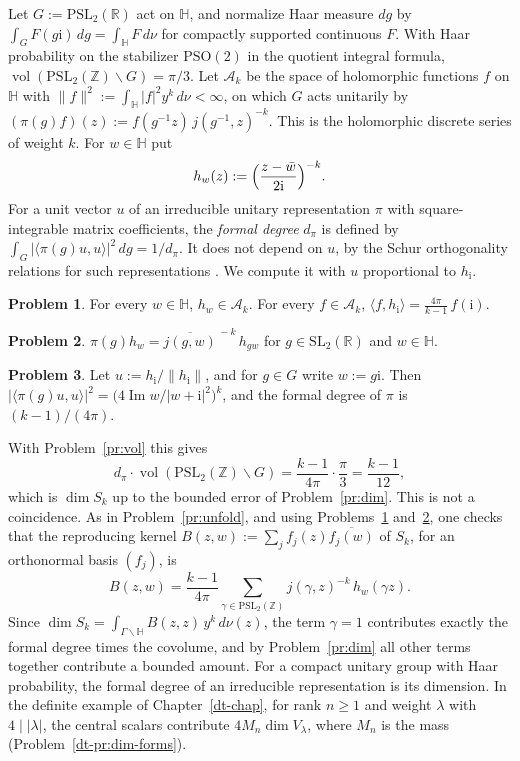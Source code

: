 \documentclass[reqno]{amsart}
\newcounter{chap}
\theoremstyle{definition}
\newtheorem{problem}{Problem}[section]
\theoremstyle{plain}
\newcommand{\Z}{\mathbb{Z}}
\newcommand{\R}{\mathbb{R}}
\newcommand{\HH}{\mathbb{H}}
\newcommand{\ii}{\mathrm{i}}
\newcommand{\Ac}{\mathcal{A}}
\newcommand{\vol}{\operatorname{vol}}
\begin{document}
Let \(G:=\mathrm{PSL}_2(\R)\) act on \(\HH\), and normalize Haar measure \(dg\) by \(\int_G F(g\ii)\,dg=\int_\HH F\,d\nu\) for compactly supported continuous \(F\).  With Haar probability on the stabilizer \(\mathrm{PSO}(2)\) in the quotient integral formula, \(\vol(\mathrm{PSL}_2(\Z)\backslash G)=\pi/3\).  Let \(\Ac_k\) be the space of holomorphic functions \(f\) on \(\HH\) with \(\lVert f\rVert^2 := \int_\HH \lvert f\rvert^2 y^k\,d\nu < \infty\), on which \(G\) acts unitarily by \((\pi(g)f)(z) := f(g^{-1}z)\,j(g^{-1},z)^{-k}\).  This is the holomorphic discrete series of weight \(k\).  For \(w \in \HH\) put
\[
  h_w(z) := \Bigl(\frac{z - \bar w}{2\ii}\Bigr)^{-k} .
\]
For a unit vector \(u\) of an irreducible unitary representation \(\pi\) with square-integrable matrix coefficients, the \emph{formal degree} \(d_\pi\) is defined by \(\int_G \lvert\langle\pi(g)u, u\rangle\rvert^2\,dg = 1/d_\pi\).  It does not depend on \(u\), by the Schur orthogonality relations for such representations \cite{HC}.  We compute it with \(u\) proportional to \(h_\ii\).

\begin{problem}\label{pr:cayley}
For every \(w \in \HH\), \(h_w \in \Ac_k\).  For every \(f \in \Ac_k\), \(\langle f, h_\ii\rangle = \frac{4\pi}{k-1}\, f(\ii)\).
\end{problem}

\begin{problem}\label{pr:covariance}
\(\pi(g)h_w = \overline{j(g,w)}^{\,-k}\, h_{gw}\) for \(g \in \mathrm{SL}_2(\R)\) and \(w \in \HH\).
\end{problem}

\begin{problem}\label{pr:formal-degree}
Let \(u := h_\ii/\lVert h_\ii\rVert\), and for \(g \in G\) write \(w := g\ii\).  Then \(\lvert\langle\pi(g)u, u\rangle\rvert^2 = \bigl(4\operatorname{Im} w/\lvert w + \ii\rvert^2\bigr)^k\), and the formal degree of \(\pi\) is \((k-1)/(4\pi)\).
\end{problem}

With Problem~\ref{pr:vol} this gives
\[
  d_\pi \cdot \vol(\mathrm{PSL}_2(\Z)\backslash G) = \frac{k-1}{4\pi}\cdot\frac\pi3 = \frac{k-1}{12} ,
\]
which is \(\dim S_k\) up to the bounded error of Problem~\ref{pr:dim}.  This is not a coincidence.  As in Problem~\ref{pr:unfold}, and using Problems~\ref{pr:cayley} and~\ref{pr:covariance}, one checks that the reproducing kernel \(B(z,w) := \sum_j f_j(z)\overline{f_j(w)}\) of \(S_k\), for an orthonormal basis \((f_j)\), is
\[
  B(z,w) = \frac{k-1}{4\pi} \sum_{\gamma \in \mathrm{PSL}_2(\Z)} j(\gamma,z)^{-k}\, h_w(\gamma z) .
\]
Since \(\dim S_k = \int_{\Gamma\backslash\HH} B(z,z)\,y^k\,d\nu(z)\), the term \(\gamma = 1\) contributes exactly the formal degree times the covolume, and by Problem~\ref{pr:dim} all other terms together contribute a bounded amount.  For a compact unitary group with Haar probability, the formal degree of an irreducible representation is its dimension.  In the definite example of Chapter~\ref{dt-chap}, for rank \(n\ge1\) and weight \(\lambda\) with \(4\mid\lvert\lambda\rvert\), the central scalars contribute \(4M_n\dim V_\lambda\), where \(M_n\) is the mass (Problem~\ref{dt-pr:dim-forms}).
\end{document}
